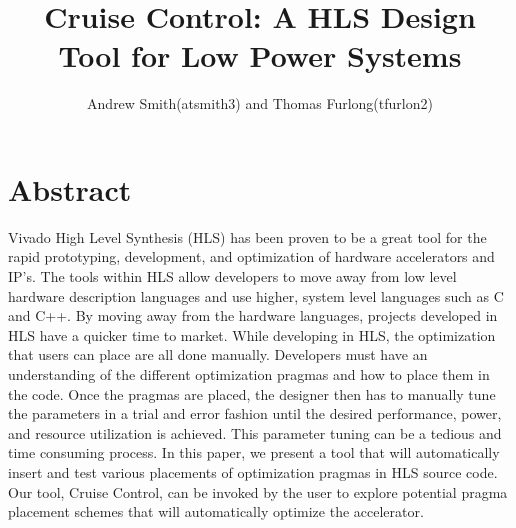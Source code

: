 \documentclass[letterpaper, 10 pt, conference]{IEEEconf}  %
\title{\LARGE \bf Cruise Control: A HLS Design Tool for Low Power Systems}
\author{Andrew Smith(atsmith3) and Thomas Furlong(tfurlon2)}%
\begin{document}
\maketitle
\thispagestyle{empty}
\pagestyle{empty}


\section{Abstract}
Vivado High Level Synthesis (HLS) has been proven to be a great tool for the rapid prototyping, development, and optimization of hardware accelerators and IP's. The tools within HLS allow developers to move away from low level hardware description languages and use higher, system level languages such as C and C++. By moving away from the hardware languages, projects developed in HLS have a quicker time to market. While developing in HLS, the optimization that users can place are all done manually. Developers must have an understanding of the different optimization pragmas and how to place them in the code. Once the pragmas are placed, the designer then has to manually tune the parameters in a trial and error fashion until the desired performance, power, and resource utilization is achieved. This parameter tuning can be a tedious and time consuming process. In this paper, we present a tool that will automatically insert and test various placements of optimization pragmas in HLS source code. Our tool, Cruise Control, can be invoked by the user to explore potential pragma placement schemes that will automatically optimize the accelerator.
	
\end{document}
